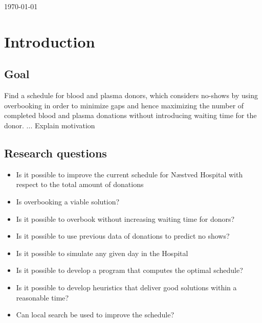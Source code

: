 \documentclass[a4paper,12pt]{article}
\begin{document}
\begin{titlepage}
		
		
		
		\vfill\vfill\vfill %
		
		{\large\today} %
		
		
		\vfill\vfill

		
		\vfill %
		
	\end{titlepage}
	\pagebreak

\thispagestyle{empty}
\newpage
\tableofcontents
\setcounter{page}{1}

\section*{Introduction}

\subsection*{Goal}

Find a schedule for blood and plasma donors, which considers no-shows by using overbooking in order to minimize gaps and hence maximizing the number of completed blood and plasma donations without introducing waiting time for the donor.
... Explain motivation

\subsection*{Research questions}

\begin{itemize}
    \item Is it possible to improve the current schedule for Næstved Hospital with respect to the total amount of donations
    \item Is overbooking a viable solution?
    \item Is it possible to overbook without increasing waiting time for donors?
    \item Is it possible to use previous data of donations to predict no shows?
    \item Is it possible to simulate any given day in the Hospital
    \item Is it possible to develop a program that computes the optimal schedule?
    \item Is it possible to develop heuristics that deliver good solutions within a reasonable time?
    \item Can local search be used to improve the schedule?
\end{itemize}
\end{document}
